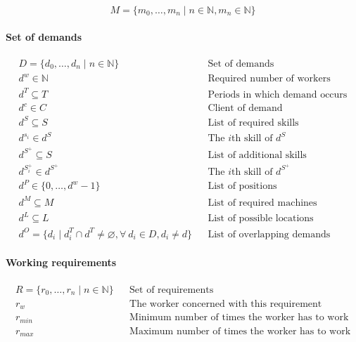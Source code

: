 \documentclass[../../thesis.tex]{subfiles}
\begin{document}
\begin{equation*}
  M = \{ m_0, \dots, m_n \mid n \in \mathbb{N}, m_n \in \mathbb{N} \}
\end{equation*}


\paragraph{Set of demands}

\begin{align*}
  D = \{ d_0, \dots, d_n \mid n \in \mathbb{N} \} && \text{Set of demands} \\
  d^w \in \mathbb{N} && \text{Required number of workers} \\ 
  d^T \subseteq T && \text{Periods in which demand occurs} \\ 
  d^c \in C && \text{Client of demand} \\ 
  d^S \subseteq S && \text{List of required skills} \\
  d^{s_i} \in d^S && \text{The $i$th skill of $d^S$} \\ 
  d^{S^+} \subseteq S && \text{List of additional skills} \\ 
  d^{S^+_i} \in d^{S^+} && \text{The $i$th skill of $d^{S^+}$} \\ 
  d^P \in \{ 0, \dots, d^w - 1 \} && \text{List of positions} \\
  d^M \subseteq M && \text{List of required machines} \\ 
  d^L \subseteq L && \text{List of possible locations} \\
  d^O = \{ d_i \mid d_i^T \cap d^T \neq \varnothing, \forall \ d_i \in D, d_i \neq d \} && \text{List of overlapping demands}
\end{align*}

\paragraph{Working requirements}

\begin{align*}
    R = \{ r_0, \dots, r_n \mid n \in \mathbb{N} \} && \text{Set of requirements} \\ 
    r_{w}   && \text{The worker concerned with this requirement} \\
    r_{min} && \text{Minimum number of times the worker has to work} \\
    r_{max} && \text{Maximum number of times the worker has to work}
\end{align*}
\end{document}
